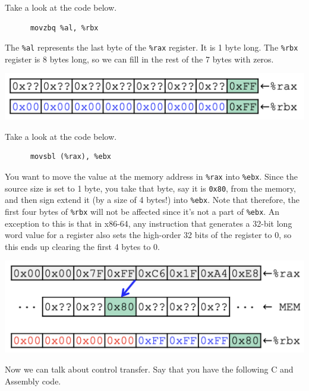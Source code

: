 \documentclass{article}
\begin{document}
  \begin{example}
    Take a look at the code below. 
    \begin{lstlisting}
      movzbq %al, %rbx
    \end{lstlisting}
    The \texttt{\%al} represents the last byte of the \texttt{\%rax} register. It is 1 byte long. The \texttt{\%rbx} register is 8 bytes long, so we can fill in the rest of the 7 bytes with zeros. 
    \begin{center}  
      \includegraphics[scale=0.5]{img/movzbq.png}
    \end{center}
  \end{example}

  \begin{example}
    Take a look at the code below. 
    \begin{lstlisting}
      movsbl (%rax), %ebx
    \end{lstlisting}
    You want to move the value at the memory address in \texttt{\%rax} into \texttt{\%ebx}. Since the source size is set to 1 byte, you take that byte, say it is \texttt{0x80}, from the memory, and then sign extend it (by a size of 4 bytes!) into \texttt{\%ebx}. Note that therefore, the first four bytes of \texttt{\%rbx} will not be affected since it's not a part of \texttt{\%ebx}. An exception to this is that in x86-64, any instruction that generates a 32-bit long word value for a register also sets the high-order 32 bits of the register to 0, so this ends up clearing the first 4 bytes to 0. 
    \begin{center}  
      \includegraphics[scale=0.5]{img/movsbl.png}
    \end{center}
  \end{example}

  Now we can talk about control transfer. Say that you have the following C and Assembly code. 
  
\end{document}

